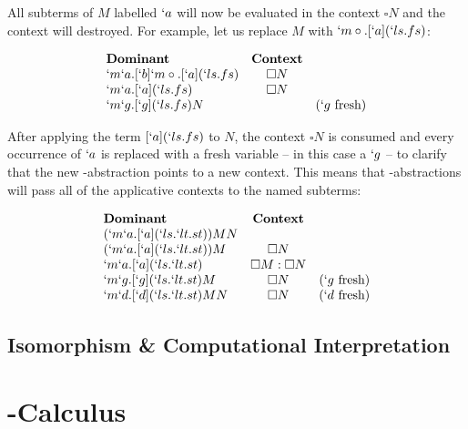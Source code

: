   All subterms of $M$ labelled $`a$ will now be evaluated in the context 
  $\square N$ and the context will destroyed. For example, let us replace 
  $M$ with \mbox{$`m\circ.[`a](`ls.fs)$}:
  
  \begin{example}
    \[
    \begin{array}{lcr}
    \textbf{Dominant} & \textbf{Context} \\
    `m`a.[`b]`m\circ.[`a](`ls.fs)    & \square N \\
    `m`a.[`a](`ls.fs)    & \square N \\
    `m`g.[`g](`ls.fs)N   & & (`g\ \text{fresh})  \\
    \end{array}
    \]
  \end{example}

  After applying the term $[`a](`ls.fs)$ to $N$, the context $\square N$
  is consumed and every occurrence of $`a$ is replaced with a fresh 
  variable -- in this case a $`g$ -- to clarify that the new 
  \lmu-abstraction points to a new context. This means that 
  \lmu-abstractions will pass all of the applicative contexts to the
  named subterms:
  
  \begin{example}
    \[
    \begin{array}{lcr}
    \textbf{Dominant} & \textbf{Context} \\
    (`m`a.[`a](`ls.`lt.st)) M N \\
    (`m`a.[`a](`ls.`lt.st))M & \square N \\
    `m`a.[`a](`ls.`lt.st) & \square M:\square N \\
    `m`g.[`g](`ls.`lt.st)M & \square N & (`g\ \text{fresh}) \\
    `m`d.[`d](`ls.`lt.st)MN & \square N & (`d\ \text{fresh}) \\
    \end{array}
    \]
  \end{example}
  
  \subsection{Isomorphism \& Computational Interpretation}

\section{\ltry-Calculus}

